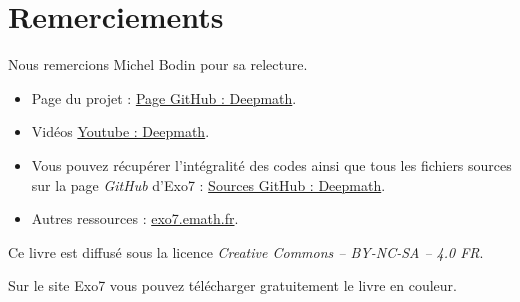 
\clearemptydoublepage
\pagestyle{empty}\thispagestyle{empty}

\vspace*{\fill}

\section*{Remerciements}


Nous remercions Michel Bodin pour sa relecture.


\bigskip

\begin{itemize}

  \item Page du projet : \href{https://exo7math.github.io/deepmath-exo7/}{\og{}Page GitHub : Deepmath\fg{}}.

  \item Vidéos \href{https://www.youtube.com/channel/UCnKarYaG1VuzdWix1vBitFg/}{\og{}Youtube : Deepmath\fg{}}.

  \item Vous pouvez récupérer l'intégralité des codes \Python{} ainsi que tous les fichiers sources sur la page \emph{GitHub} d'Exo7 :
\href{https://github.com/exo7math/deepmath-exo7}{\og{}Sources GitHub : Deepmath\fg{}}.
  
  \item Autres ressources : \href{http://exo7.emath.fr/}{exo7.emath.fr}.
\end{itemize}




\vspace*{\fill}

\bigskip 

\begin{center}
\end{center}



\begin{center}
Ce livre est diffusé sous la licence \emph{Creative Commons -- BY-NC-SA -- 4.0 FR}.

Sur le site Exo7 vous pouvez télécharger gratuitement le livre en couleur.
\end{center}




\printindex
{}

